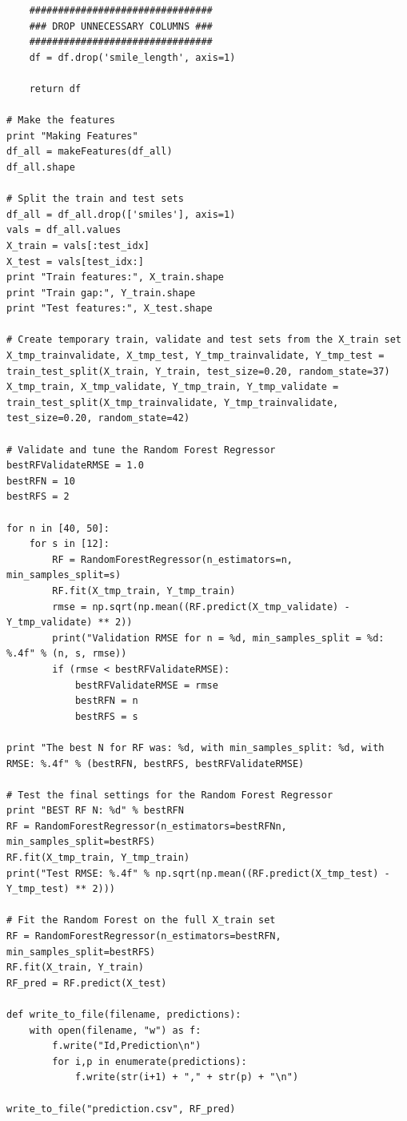 \documentclass[]{article}
\begin{document}
\begin{flushleft}
\begin{lstlisting}
    ################################
    ### DROP UNNECESSARY COLUMNS ###
    ################################   
    df = df.drop('smile_length', axis=1)
    
    return df

# Make the features
print "Making Features"
df_all = makeFeatures(df_all)
df_all.shape

# Split the train and test sets
df_all = df_all.drop(['smiles'], axis=1)
vals = df_all.values
X_train = vals[:test_idx]
X_test = vals[test_idx:]
print "Train features:", X_train.shape
print "Train gap:", Y_train.shape
print "Test features:", X_test.shape

# Create temporary train, validate and test sets from the X_train set
X_tmp_trainvalidate, X_tmp_test, Y_tmp_trainvalidate, Y_tmp_test = train_test_split(X_train, Y_train, test_size=0.20, random_state=37)
X_tmp_train, X_tmp_validate, Y_tmp_train, Y_tmp_validate = train_test_split(X_tmp_trainvalidate, Y_tmp_trainvalidate, test_size=0.20, random_state=42)

# Validate and tune the Random Forest Regressor
bestRFValidateRMSE = 1.0
bestRFN = 10
bestRFS = 2

for n in [40, 50]:
    for s in [12]:
        RF = RandomForestRegressor(n_estimators=n, min_samples_split=s)
        RF.fit(X_tmp_train, Y_tmp_train)
        rmse = np.sqrt(np.mean((RF.predict(X_tmp_validate) - Y_tmp_validate) ** 2))
        print("Validation RMSE for n = %d, min_samples_split = %d: %.4f" % (n, s, rmse))
        if (rmse < bestRFValidateRMSE):
            bestRFValidateRMSE = rmse
            bestRFN = n
            bestRFS = s

print "The best N for RF was: %d, with min_samples_split: %d, with RMSE: %.4f" % (bestRFN, bestRFS, bestRFValidateRMSE)

# Test the final settings for the Random Forest Regressor
print "BEST RF N: %d" % bestRFN
RF = RandomForestRegressor(n_estimators=bestRFNn, min_samples_split=bestRFS)
RF.fit(X_tmp_train, Y_tmp_train)
print("Test RMSE: %.4f" % np.sqrt(np.mean((RF.predict(X_tmp_test) - Y_tmp_test) ** 2)))

# Fit the Random Forest on the full X_train set
RF = RandomForestRegressor(n_estimators=bestRFN, min_samples_split=bestRFS)
RF.fit(X_train, Y_train)
RF_pred = RF.predict(X_test)

def write_to_file(filename, predictions):
    with open(filename, "w") as f:
        f.write("Id,Prediction\n")
        for i,p in enumerate(predictions):
            f.write(str(i+1) + "," + str(p) + "\n")
            
write_to_file("prediction.csv", RF_pred)
\end{lstlisting}


\end{flushleft}	
\end{document}
